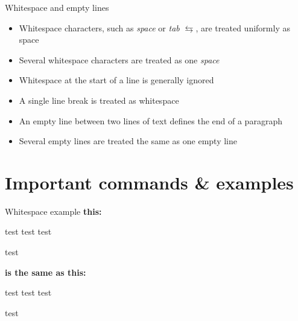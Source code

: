 \documentclass[presentation, aspectratio=1610]{beamer}
\begin{document}
	\begin{frame}{Whitespace and empty lines}
	\begin{itemize}
		\item Whitespace characters, such as \textit{space} \textvisiblespace{} or \textit{tab} $\leftrightarrows$, are treated uniformly as space
		\item Several whitespace characters are treated as one \textit{space}
		\item Whitespace at the start of a line is generally ignored
		\item A single line break is treated as whitespace
		\item An empty line between two lines of text defines the end of a paragraph
		\item Several empty lines are treated the same as one empty line
	\end{itemize}
\end{frame}

\section{Important commands \& examples}
\begin{frame}[fragile]{Whitespace example}
	\textbf{this:}
	\begin{LTXexample}[showspaces = true,showtabs = true,rframe=simple]
		test test test

		test
	\end{LTXexample}

	\textbf{is the same as this:}

	\begin{LTXexample}[	showspaces = true,showtabs = true,rframe=simple]
		test
		test    test


		test
	\end{LTXexample}
\end{frame}
\end{document}
